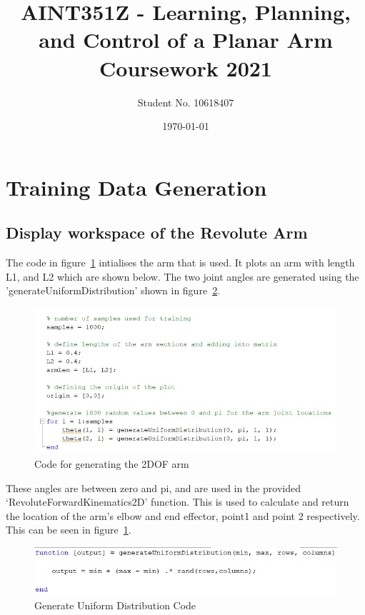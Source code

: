 \documentclass [11pt]{article}
\begin{document}
							
\title{\bf AINT351Z - Learning, Planning, and Control of a Planar Arm Coursework 2021} 	
\author{Student No. 10618407} 								
\date{\today} 										
\maketitle 												
{}			
\newpage			
\setcounter{page}{2}								
\tableofcontents 
\newpage

\section{Training Data Generation}	
\subsection{Display workspace of the Revolute Arm}

The code in figure~\ref{fig:codeForArm} intialises the arm that is used. It plots an arm with length L1, and L2 which are shown below. The two joint angles are generated using the 'generateUniformDistribution' shown in figure~\ref{fig:uniformDistribution}.

\begin{figure}[H]
\centerline{\includegraphics[width=12cm]{generateArmDataCode}}
\caption{Code for generating the 2DOF arm}
\label{fig:codeForArm}
\end{figure}

These angles are between zero and pi, and are used in the provided ‘RevoluteForwardKinematics2D’ function. This is used to calculate and return the location of the arm’s elbow and end effector, point1 and point 2 respectively. This can be seen in figure~\ref{fig:codeForArm}.

\begin{figure}[H]
\centerline{\includegraphics[width=12cm]{generateUniformDistribution.jpg}}
\caption{Generate Uniform Distribution Code}
\label{fig:uniformDistribution}
\end{figure}
\end{document}

